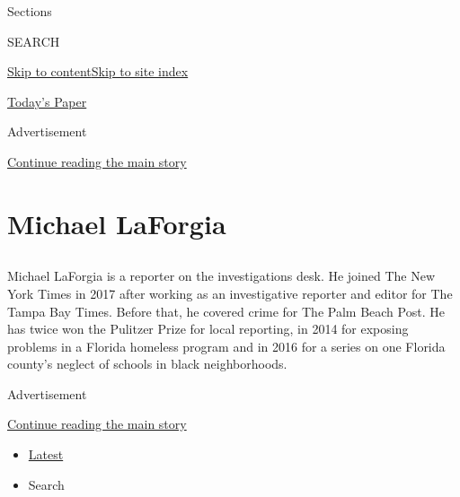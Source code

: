 Sections

SEARCH

\protect\hyperlink{site-content}{Skip to
content}\protect\hyperlink{site-index}{Skip to site index}

\href{https://myaccount.nytimes.com/auth/login?response_type=cookie\&client_id=vi}{}

\href{https://www.nytimes.com/section/todayspaper}{Today's Paper}

Advertisement

\protect\hyperlink{after-top}{Continue reading the main story}

\hypertarget{michael-laforgia}{%
\section{Michael LaForgia}\label{michael-laforgia}}

\subsection{}

Michael LaForgia is a reporter on the investigations desk. He joined The
New York Times in 2017 after working as an investigative reporter and
editor for The Tampa Bay Times. Before that, he covered crime for The
Palm Beach Post. He has twice won the Pulitzer Prize for local
reporting, in 2014 for exposing problems in a Florida homeless program
and in 2016 for a series on one Florida county's neglect of schools in
black neighborhoods.

Advertisement

\protect\hyperlink{after-mid1}{Continue reading the main story}

\begin{itemize}
\tightlist
\item
  \protect\hyperlink{stream-panel}{Latest}
\item
  Search
\end{itemize}

